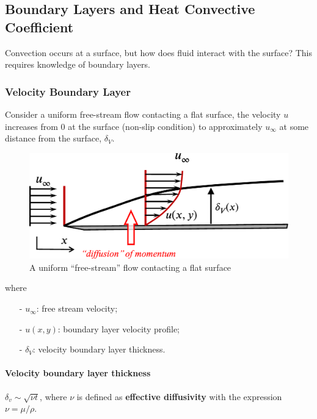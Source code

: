\documentclass[12pt, a4paper]{article}
\numberwithin{equation}{subsection}
\begin{document}
\subsection{Boundary Layers and Heat Convective Coefficient}
Convection occurs at a surface, but how does fluid interact with the surface? This requires knowledge of boundary layers.

\subsubsection{Velocity Boundary Layer} 
Consider a uniform free-stream flow contacting a flat surface, the velocity $u$ increases from 0 at the surface (non-slip condition) to approximately $u_{\infty}$ at some distance from the surface, $\delta_{V}$.
\begin{figure}[H]
    \centering
    \includegraphics[width=.7\textwidth]{img/velocity_boundary_layer.eps}
    \caption{A uniform “free-stream” flow contacting a flat surface}
    \label{fig:velocity_BL}
\end{figure}
where 
\begin{itemize}
    \item[-] $u_\infty$: free stream velocity;
    \item[-] $u(x, y)$: boundary layer velocity profile;
    \item[-] $\delta_V$: velocity boundary layer thickness.
\end{itemize}

\paragraph{Velocity boundary layer thickness}  $\delta_{v} \sim \sqrt{\nu t}$, where $\nu$ is defined as \textbf{effective diffusivity} with the expression $\nu = \mu/\rho$.
\end{document}
